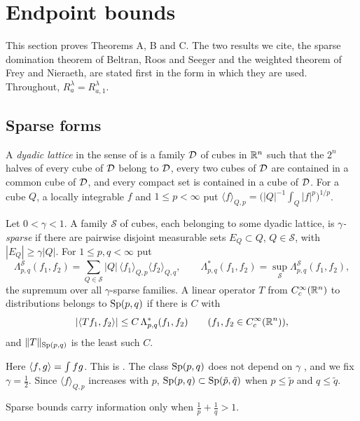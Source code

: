 \section{Endpoint bounds}\label{sec:endpoint}

This section proves Theorems A, B and C. The two results we cite, the sparse domination theorem
of Beltran, Roos and Seeger and the weighted theorem of Frey and Nieraeth, are stated first in the
form in which they are used. Throughout, $R^\lambda_a=R^\lambda_{a,1}$.

\subsection{Sparse forms}\label{ssec:sparse}
A \emph{dyadic lattice} in the sense of \cite[\S2]{LN19} is a family $\mathcal D$ of cubes in $\mathbb{R}^n$ such
that the $2^n$ halves of every cube of $\mathcal D$ belong to $\mathcal D$, every two cubes of $\mathcal D$ are contained in a
common cube of $\mathcal D$, and every compact set is contained in a cube of $\mathcal D$. For a cube $Q$, a locally
integrable $f$ and $1\le p<\infty$ put $\langle f\rangle_{Q,p}=\bigl(|Q|^{-1}\int_Q|f|^p\bigr)^{1/p}$.

\begin{definition}\label{def:sparse}
Let $0<\gamma<1$. A family $\mathcal S$ of cubes, each belonging to some dyadic lattice, is
\emph{$\gamma$-sparse} if there are pairwise disjoint measurable sets $E_Q\subset Q$, $Q\in\mathcal S$,
with $|E_Q|\ge\gamma|Q|$. For $1\le p,q<\infty$ put
\[
\Lambda^{\mathcal S}_{p,q}(f_1,f_2)=\sum_{Q\in\mathcal S}|Q|\,\langle f_1\rangle_{Q,p}\langle f_2\rangle_{Q,q},
\qquad
\Lambda^*_{p,q}(f_1,f_2)=\sup_{\mathcal S}\Lambda^{\mathcal S}_{p,q}(f_1,f_2),
\]
the supremum over all $\gamma$-sparse families. A linear operator $T$ from $C^\infty_c(\mathbb{R}^n)$ to
distributions belongs to $\mathrm{Sp}(p,q)$ if there is $C$ with
\begin{equation}\label{eq:sparse}
|\langle Tf_1,f_2\rangle|\le C\,\Lambda^*_{p,q}(f_1,f_2)\qquad(f_1,f_2\in C^\infty_c(\mathbb{R}^n)),
\end{equation}
and $\|T\|_{\mathrm{Sp}(p,q)}$ is the least such $C$.
\end{definition}

Here $\langle f,g\rangle=\int fg$. This is \cite[(1.2)--(1.4)]{BRS25}. The class $\mathrm{Sp}(p,q)$ does not depend on
$\gamma$ \cite{LN19}, and we fix $\gamma=\frac12$. Since $\langle f\rangle_{Q,p}$ increases with $p$,
$\mathrm{Sp}(p,q)\subset\mathrm{Sp}(\tilde p,\tilde q)$ when $p\le\tilde p$ and $q\le\tilde q$.

Sparse bounds carry information only when $\frac1p+\frac1q>1$.

